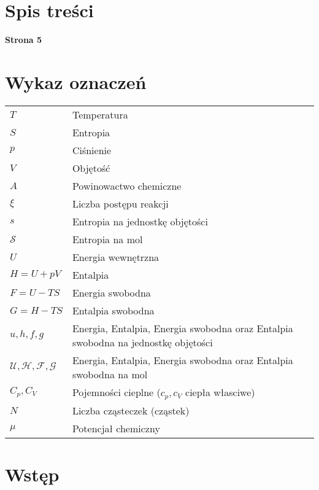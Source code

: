 \documentclass[10pt, a4paper, twoside, onecolumn]{article}
\numberwithin{equation}{section}
\begin{document}
	\section*{Spis treści}
	\begin{center}
		\textbf{Strona 5}
	\end{center}
	\tableofcontents
	\pagebreak
	
	\section*{Wykaz oznaczeń}
	\setlength{\parindent}{0cm}
	\begin{table}[H]
	\begin{tabular}{@{} ll}
		\(T\) & Temperatura \\
		\(S\) & Entropia \\
		\(p\) & Ciśnienie \\
		\(V\) & Objętość \\
		\(A\) & Powinowactwo chemiczne \\
		\(\xi\) & Liczba postępu reakcji \\
		\(s\) & Entropia na jednostkę objętości \\
		\(\mathscr{S}\) & Entropia na mol \\
		\(U\) & Energia wewnętrzna \\
		\(H=U+pV\) & Entalpia \\
		\(F=U-TS\) & Energia swobodna \\
		\(G=H-TS\) & Entalpia swobodna \\
		\(u, h, f, g\) & Energia, Entalpia, Energia swobodna oraz Entalpia swobodna na jednostkę objętości \\
		\(\mathscr{U, H, F, G}\) & Energia, Entalpia, Energia swobodna oraz Entalpia swobodna na mol \\
		\(C_{p}, C_{V}\) & Pojemności cieplne (\(c_{p}, c_{V}\) ciepła własciwe) \\
		\(N\) & Liczba cząsteczek (cząstek) \\
		\(\mu\) & Potencjał chemiczny
	\end{tabular}
	\end{table}
	\setlength{\parindent}{1.25cm}
	\pagebreak
	
	\section{Wstęp}
	
\end{document}
